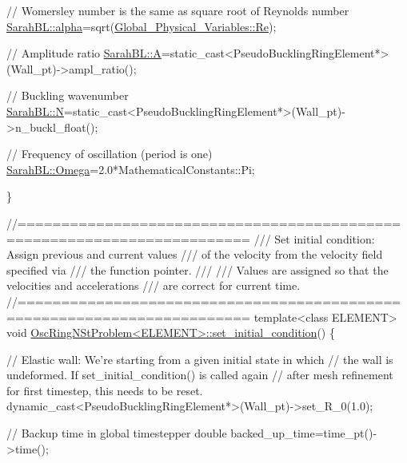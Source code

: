 \begin{DoxyCodeInclude}
 \textcolor{comment}{// Womersley number is the same as square root of Reynolds number}
 \hyperlink{namespaceoomph_1_1SarahBL_ab07de8eb877306afdc10ba4a17c6406b}{SarahBL::alpha}=sqrt(\hyperlink{namespaceGlobal__Physical__Variables_ab814e627d2eb5bc50318879d19ab16b9}{Global\_Physical\_Variables::Re});

 \textcolor{comment}{// Amplitude ratio}
 \hyperlink{namespaceoomph_1_1SarahBL_a5b48abf91ca062e8bfeab87f1d4a9499}{SarahBL::A}=\textcolor{keyword}{static\_cast<}PseudoBucklingRingElement*\textcolor{keyword}{>}(Wall\_pt)->ampl\_ratio();

 \textcolor{comment}{// Buckling wavenumber}
 \hyperlink{namespaceoomph_1_1SarahBL_a3f2e6fdba588e1883d317f6e0cd7f32f}{SarahBL::N}=\textcolor{keyword}{static\_cast<}PseudoBucklingRingElement*\textcolor{keyword}{>}(Wall\_pt)->n\_buckl\_float();

 \textcolor{comment}{// Frequency of oscillation (period is one)}
 \hyperlink{namespaceoomph_1_1SarahBL_a370241de5869d0f53fc7cd17858bfbfe}{SarahBL::Omega}=2.0*MathematicalConstants::Pi;

\}





\textcolor{comment}{//========================================================================}\textcolor{comment}{}
\textcolor{comment}{/// Set initial condition: Assign previous and current values}
\textcolor{comment}{/// of the velocity from the velocity field specified via}
\textcolor{comment}{/// the function pointer.}
\textcolor{comment}{///}
\textcolor{comment}{/// Values are assigned so that the velocities and accelerations}
\textcolor{comment}{/// are correct for current time.}
\textcolor{comment}{}\textcolor{comment}{//========================================================================}
\textcolor{keyword}{template}<\textcolor{keyword}{class} ELEMENT>
\textcolor{keywordtype}{void} \hyperlink{classOscRingNStProblem_ab1f2083699d00da4b7f6116e10792e86}{OscRingNStProblem<ELEMENT>::set\_initial\_condition}()
\{ 

 \textcolor{comment}{// Elastic wall: We're starting from a given initial state in which}
 \textcolor{comment}{// the wall is undeformed. If set\_initial\_condition() is called again}
 \textcolor{comment}{// after mesh refinement for first timestep, this needs to be reset.}
 \textcolor{keyword}{dynamic\_cast<}PseudoBucklingRingElement*\textcolor{keyword}{>}(Wall\_pt)->set\_R\_0(1.0); 

 \textcolor{comment}{// Backup time in global timestepper}
 \textcolor{keywordtype}{double} backed\_up\_time=time\_pt()->time();
         

\end{DoxyCodeInclude}
